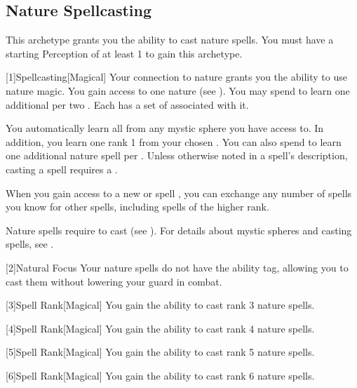     \subsection{Nature Spellcasting}
        This archetype grants you the ability to cast nature spells.
        You must have a starting Perception of at least 1 to gain this archetype.

        [1]{Spellcasting}[Magical]
        Your connection to nature grants you the ability to use nature magic.
        You gain access to one nature  (see ).
        You may spend  to learn one additional  per two .
        Each  has a set of  associated with it.

        You automatically learn all  from any mystic sphere you have access to.
        In addition, you learn one rank 1  from your chosen .
        You can also spend  to learn one additional nature spell per .
        Unless otherwise noted in a spell's description, casting a spell requires a .

        When you gain access to a new  or spell ,
            you can exchange any number of spells you know for other spells,
            including spells of the higher rank.

        Nature spells require  to cast (see ).
        For details about mystic spheres and casting spells, see .

        [2]{Natural Focus} Your nature spells do not have the  ability tag, allowing you to cast them without lowering your guard in combat.

        [3]{Spell Rank}[Magical] You gain the ability to cast rank 3 nature spells.

        [4]{Spell Rank}[Magical] You gain the ability to cast rank 4 nature spells.

        [5]{Spell Rank}[Magical] You gain the ability to cast rank 5 nature spells.

        [6]{Spell Rank}[Magical] You gain the ability to cast rank 6 nature spells.

